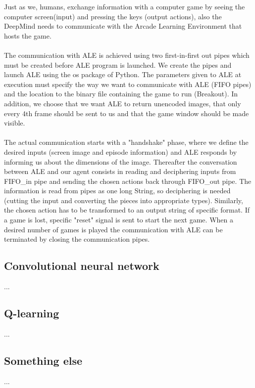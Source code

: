 \documentclass[a4paper,12pt]{article}
\begin{document}
Just as we, humans, exchange information with a computer game by seeing the computer screen(input) and pressing the keys (output actions), also the DeepMind needs to communicate with the Arcade Learning Environment that hosts the game.
\paragraph{}
The communication with ALE is achieved using two first-in-first out pipes which must be created before ALE program is launched. We create the pipes and launch ALE using the os package of Python. The parameters given to ALE at execution must specify the way we want to communicate with ALE (FIFO pipes) and the location to the binary file containing the game to run (Breakout). In addition, we choose that we want ALE to return unencoded images, that only every 4th frame should be sent to us and that the game window should be made visible.


\paragraph{}
The actual communication starts with a "handshake" phase, where we define the desired inputs (screen image and episode information) and ALE responds by informing us about the dimensions of the image. Thereafter the conversation between ALE and our agent consists in reading and deciphering inputs from FIFO_in pipe and sending the chosen actions back through FIFO_out pipe. The information is read from pipes as one long String, so deciphering is needed (cutting the input and converting the pieces into appropriate types). Similarly, the chosen action has to be transformed to an output string of specific format. If a game is lost, specific "reset" signal is sent to start the next game. When a desired number of games is played the communication with ALE can be terminated by closing the communication pipes.  


\subsection{Convolutional neural network}
...

\subsection{Q-learning}
...

\subsection{Something else}
...
\end{document}
